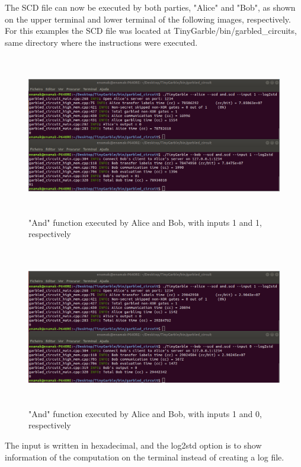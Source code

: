 \begin{refsection}
The SCD file can now be executed by both parties, "Alice" and "Bob", as shown on the upper terminal and lower terminal of the following images, respectively.
For this examples the SCD file was located at TinyGarble/bin/garbled\_circuits, same directory where the instructions were executed.

\begin{figure}[H]
	\centering
	\includegraphics[width=1\textwidth, height=7cm]{./sdf/secure_multiparty_computation/figures/tinygarble_and_a.png}
    \caption{"And" function executed by Alice and Bob, with inputs 1 and 1, respectively}\label{fig:tinygarble_and_a}
\end{figure}

\begin{figure}[H]
	\centering
	\includegraphics[width=1\textwidth, height=7cm]{./sdf/secure_multiparty_computation/figures/tinygarble_and_b.png}
    \caption{"And" function executed by Alice and Bob, with inputs 1 and 0, respectively}\label{fig:tinygarble_and_b}
\end{figure}

The input is written in hexadecimal, and the log2std option is to show information of the computation on the terminal instead of creating a log file.


\end{refsection}
